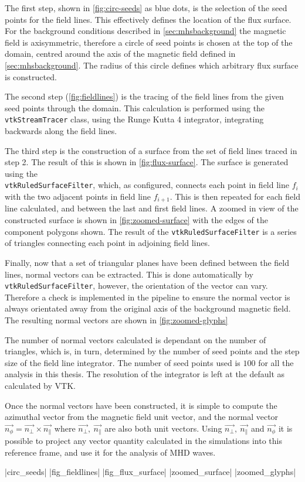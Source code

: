 The first step, shown in \cref{fig:circ-seeds} as blue dots, is the selection of the seed points for the field lines.
This effectively defines the location of the flux surface.
For the background conditions described in \cref{sec:mhsbackground} the magnetic field is axisymmetric, therefore a circle of seed points is chosen at the top of the domain, centred around the axis of the magnetic field defined in \cref{sec:mhsbackground}.
The radius of this circle defines which arbitrary flux surface is constructed.

The second step (\cref{fig:fieldlines}) is the tracing of the field lines from the given seed points through the domain.
This calculation is performed using the \verb|vtkStreamTracer| class, using the Runge Kutta 4 integrator, integrating backwards along the field lines.

The third step is the construction of a surface from the set of field lines traced in step 2.
The result of this is shown in \cref{fig:flux-surface}.
The surface is generated using the \\ \verb|vtkRuledSurfaceFilter|, which, as configured, connects each point in field line $f_i$ with the two adjacent points in field line $f_{i+1}$.
This is then repeated for each field line calculated, and between the last and first field lines.
A zoomed in view of the constructed surface is shown in \cref{fig:zoomed-surface} with the edges of the component polygons shown.
The result of the \verb|vtkRuledSurfaceFilter| is a series of triangles connecting each point in adjoining field lines.

Finally, now that a set of triangular planes have been defined between the field lines, normal vectors can be extracted.
This is done automatically by\\ \verb|vtkRuledSurfaceFilter|, however, the orientation of the vector can vary.
Therefore a check is implemented in the pipeline to ensure the normal vector is always orientated away from the original axis of the background magnetic field.
The resulting normal vectors are shown in \cref{fig:zoomed-glyphs}

The number of normal vectors calculated is dependant on the number of triangles, which is, in turn, determined by the number of seed points and the step size of the field line integrator.
The number of seed points used is $100$ for all the analysis in this thesis.
The resolution of the integrator is left at the default as calculated by VTK.

Once the normal vectors have been constructed, it is simple to compute the azimuthal vector from the magnetic field unit vector, and the normal vector $\vec{n_\phi}= \vec{n_\perp} \times \vec{n_\parallel}$ where $\vec{n_\perp},\ \vec{n_\parallel} $ are also both unit vectors.
Using  $\vec{n_\perp},\ \vec{n_\parallel}$ and $\vec{n_\phi}$ it  is possible to project any vector quantity calculated in the simulations into this reference frame, and use it for the analysis of MHD waves.


\py[chapter3a]|circ_seeds|
\py[chapter3a]|fig_fieldlines|
\py[chapter3a]|fig_flux_surface|
\py[chapter3a]|zoomed_surface|
\py[chapter3a]|zoomed_glyphs|
